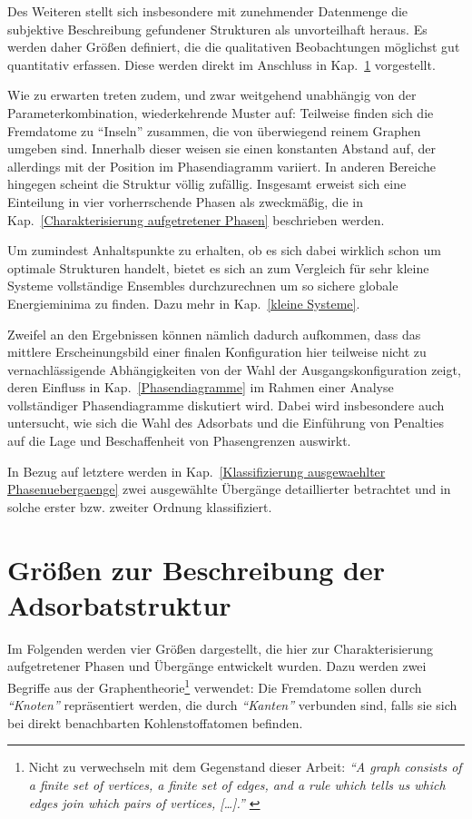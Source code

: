 \documentclass[a4paper, 10pt, twoside, openany]{book} %
\begin{document}
Des Weiteren stellt sich insbesondere mit zunehmender Datenmenge die subjektive Beschreibung gefundener Strukturen als unvorteilhaft heraus. Es werden daher Größen definiert, die die qualitativen Beobachtungen möglichst gut quantitativ erfassen. Diese werden direkt im Anschluss in Kap.~\ref{beschreibende Groessen} vorgestellt.

Wie zu erwarten treten zudem, und zwar weitgehend unabhängig von der Parameterkombination, wiederkehrende Muster auf: Teilweise finden sich die Fremdatome zu "`Inseln"' zusammen, die von überwiegend reinem Graphen umgeben sind. Innerhalb dieser weisen sie einen konstanten Abstand auf, der allerdings mit der Position im Phasendiagramm variiert. In anderen Bereiche hingegen scheint die Struktur völlig zufällig. Insgesamt erweist sich eine Einteilung in vier vorherrschende Phasen als zweckmäßig, die in Kap.~\ref{Charakterisierung aufgetretener Phasen} beschrieben werden.

Um zumindest Anhaltspunkte zu erhalten, ob es sich dabei wirklich schon um optimale Strukturen handelt, bietet es sich an zum Vergleich für sehr kleine Systeme vollständige Ensembles durchzurechnen um so sichere globale Energieminima zu finden. Dazu mehr in Kap.~\ref{kleine Systeme}.

Zweifel an den Ergebnissen können nämlich dadurch aufkommen, dass das mittlere Erscheinungsbild einer finalen Konfiguration hier teilweise nicht zu vernachlässigende Abhängigkeiten von der Wahl der Ausgangskonfiguration zeigt, deren Einfluss in Kap.~\ref{Phasendiagramme} im Rahmen einer Analyse vollständiger Phasendiagramme diskutiert wird. Dabei wird insbesondere auch untersucht, wie sich die Wahl des Adsorbats und die Einführung von Penalties auf die Lage und Beschaffenheit von Phasengrenzen auswirkt.

In Bezug auf letztere werden in Kap.~\ref{Klassifizierung ausgewaehlter Phasenuebergaenge} zwei ausgewählte Übergänge detaillierter betrachtet und in solche erster bzw. zweiter Ordnung klassifiziert.

\section{Größen zur Beschreibung der Adsorbatstruktur}
\label{beschreibende Groessen}

Im Folgenden werden vier Größen dargestellt, die hier zur Charakterisierung aufgetretener Phasen und Übergänge entwickelt wurden. Dazu werden zwei Begriffe aus der Graphentheorie\footnote{Nicht zu verwechseln mit dem Gegenstand dieser Arbeit: \emph{"`A graph consists of a finite set of vertices, a finite set of edges, and a rule which tells us which edges join which pairs of vertices, \emph{[\dots]}."' \cite[S. 9]{Biggs}}} verwendet: Die Fremdatome sollen durch \emph{"`Knoten"'} repräsentiert werden, die durch \emph{"`Kanten"'} verbunden sind, falls sie sich bei direkt benachbarten Kohlenstoffatomen befinden.
\end{document}
